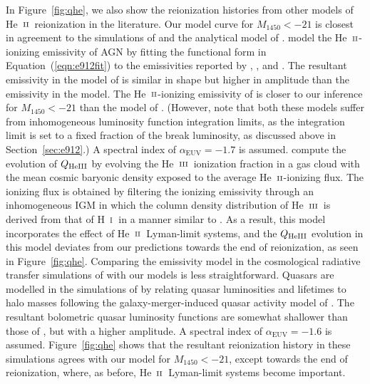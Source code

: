 \documentclass[fleqn,usenatbib]{mnras}
\def\HI{\hbox{H~$\scriptstyle\rm I$}}
\def\nHeIII{{\rm HeIII}}
\def\HeII{\hbox{He~$\scriptstyle\rm II$}}
\def\HeIII{\hbox{He~$\scriptstyle\rm III$}}
\def\HeIII{\hbox{He~$\scriptstyle\rm III$}}
\begin{document}
      In Figure~\ref{fig:qhe}, we also show the reionization histories from
      other models of \HeII\ reionization in the literature.  Our model
      curve for $M_\mathrm{1450}<-21$ is closest in agreement to the
      simulations of \citet{2009ApJ...694..842M} and the analytical model of
      \citet{2018arXiv180104931P}.  \citet{2018arXiv180104931P} model the
      \HeII-ionizing emissivity of AGN by fitting the functional form in
      Equation~(\ref{eqn:e912fit}) to the emissivities reported by
      \citet{2009A&A...507..781S}, \citet{2007A&A...472..443B}, and
      \citet{2012ApJ...755..169M}.  The resultant emissivity in the model of
      \citet{2018arXiv180104931P} is similar in shape but higher in
      amplitude than the emissivity in the \citet{2012ApJ...746..125H}
      model.  The \HeII-ionizing emissivity of \citet{2018arXiv180104931P}
      is closer to our inference for $M_\mathrm{1450}<-21$ than the model of
      \citet{2012ApJ...746..125H}.  (However, note that both these models
      suffer from inhomogeneous luminosity function integration limits, as
      the integration limit is set to a fixed fraction of the break
      luminosity, as discussed above in Section~\ref{sec:e912}.)  A spectral
      index of $\alpha_\mathrm{EUV}=-1.7$ is assumed.
      \citet{2018arXiv180104931P} compute the evolution of $Q_\nHeIII$ by
      evolving the \HeIII\ ionization fraction in a gas cloud with the mean
      cosmic baryonic density exposed to the average \HeII-ionizing flux.
      The ionizing flux is obtained by filtering the ionizing emissivity
      through an inhomogeneous IGM in which the column density distribution
      of \HeIII\ is derived from that of \HI\ in a manner similar to
      \citet{2012ApJ...746..125H}.  As a result, this model incorporates the
      effect of \HeII\ Lyman-limit systems, and the $Q_\nHeIII$ evolution in
      this model deviates from our predictions towards the end of
      reionization, as seen in Figure~\ref{fig:qhe}.  Comparing the
      emissivity model in the cosmological radiative transfer simulations of
      \citet{2009ApJ...694..842M} with our models is less straightforward.
      Quasars are modelled in the simulations of \citet{2009ApJ...694..842M}
      by relating quasar luminosities and lifetimes to halo masses following
      the galaxy-merger-induced quasar activity model of
      \citet{2005ApJ...630..705H}.  The resultant bolometric quasar
      luminosity functions are somewhat shallower than those of
      \citet{2007ApJ...654..731H}, but with a higher amplitude.  A spectral
      index of $\alpha_\mathrm{EUV}=-1.6$ is assumed.  Figure~\ref{fig:qhe}
      shows that the resultant reionization history in these simulations
      agrees with our model for $M_\mathrm{1450}<-21$, except towards the
      end of reionization, where, as before, \HeII\ Lyman-limit systems
      become important.
\end{document}
